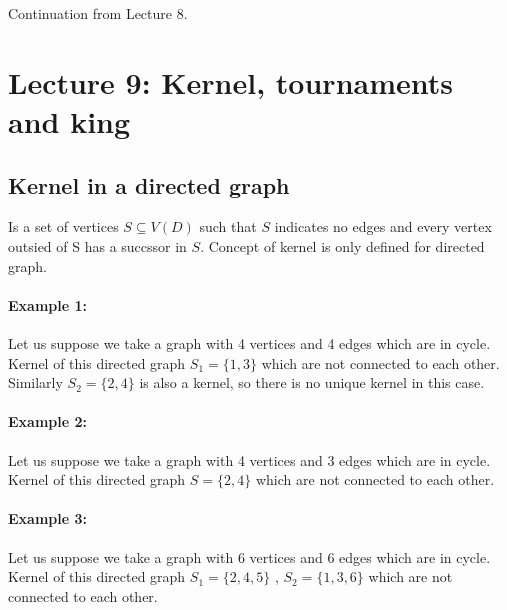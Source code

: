 



Continuation from Lecture 8. 
\section{Lecture 9: Kernel, tournaments and king}

\subsection{Kernel in a directed graph}

Is a set of vertices $S \subseteq V(D)$ such that $S$ indicates no edges and every vertex outsied of S has a succssor in $S$. Concept of kernel is only defined for directed graph. 

\paragraph{Example 1:}Let us suppose we take a graph with 4 vertices and 4 edges which are in cycle. Kernel of this directed graph $ S_1 = \{1, 3\}$ which are not connected to each other. Similarly $ S_2 = \{2, 4\}$ is also a kernel, so there is no unique kernel in this case.

\paragraph{Example 2:}Let us suppose we take a graph with 4 vertices and 3 edges which are in cycle. Kernel of this directed graph $ S = \{2, 4\}$ which are not connected to each other. 

\paragraph{Example 3:}Let us suppose we take a graph with 6 vertices and 6 edges which are in cycle. Kernel of this directed graph $ S_1 = \{2, 4, 5\}$ , $ S_2 = \{1, 3, 6\}$ which are not connected to each other. 

